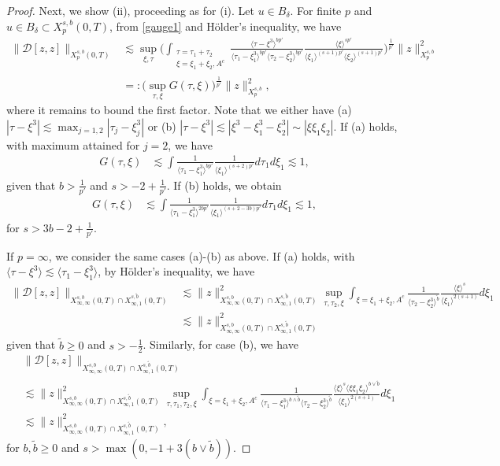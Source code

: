 \documentclass[a4paper,
11pt,  reqno]{amsart}
\newcommand{\5}{\textup{V}}
\newcommand{\les}{\lesssim}
\newcommand{\dl}{\delta}
\newcommand{\wt}{\widetilde}
\theoremstyle{remark}
\newcommand{\jb}[1]
{\langle #1 \rangle}
\numberwithin{equation}{section}
\numberwithin{theorem}{section}
\newcommand{\DD}{\mathcal{D}}
\begin{document}
\begin{proof}
Next, we show (ii), proceeding as for (i). Let $u \in B_\dl$. 
For finite $p$ and $u\in B_\dl \subset X^{s, b}_{p}(0,T)$,
from \eqref{gauge1} and H\"older's inequality,
we have
\begin{align}
\| \DD[z,z] \|_{X^{s, b}_p(0,T)} 
&
\les
\sup_{\xi, \tau} \bigg( \int_{\substack{\tau=\tau_1 + \tau_2 \\ \xi = \xi_1 + \xi_2, A^c}} 
\frac{\jb{\tau-\xi^3}^{bp'}}{\jb{\tau_1-\xi_1^3}^{bp'} \jb{\tau_2 - \xi_2^3}^{bp'} } \frac{\jb{\xi}^{sp'}}{ \jb{\xi_1}^{(s+1)p'} \jb{\xi_2}^{(s+1)p'}}
\bigg)^{\frac{1}{p'}}
\| z\|^2_{X^{s, b}_{p}}
\\
&
=: \Big( \sup_{ \tau, \xi} G(\tau, \xi) \Big)^{\frac{1}{p'}}
\| z\|^2_{X^{s, b}_{p}}
,
\end{align}
where it remains to bound the first factor. 
Note that we either have (a) $|\tau- \xi^3| \les \max_{j=1,2} |\tau_j - \xi_j^3|$ or (b) $|\tau - \xi^3| \les |\xi^3 - \xi_1^3 - \xi_2^3| \sim |\xi \xi_1\xi_2|$.
If (a) holds, with maximum attained for $j=2$, we have
\begin{align}
    G(\tau, \xi) 
    &
    \les 
    \int \frac{1}{\jb{\tau_1 - \xi_1^3}^{bp'}} \frac{1}{\jb{\xi_1}^{(s+2)p'}} d\tau_1 d\xi_1 \les 1, 
\end{align}
given that $b> \frac{1}{p'}$ and $s>-2 + \frac{1}{p'}$. If (b) holds, we obtain
\begin{align}
    G(\tau, \xi) 
    &
    \les 
    \int \frac{1}{\jb{\tau_1 - \xi_1^3}^{2bp'}} \frac{1}{\jb{\xi_1}^{(s+2-3b)p'}} d\tau_1 d\xi_1 \les 1, 
\end{align}
for $s>3b - 2 + \frac{1}{p'}$.

If $p=\infty$, we consider the same cases (a)-(b) as above.
If (a) holds, with $\jb{\tau-\xi^3} \les \jb{\tau_1 - \xi_1^3}$, by H\"older's inequality, we have 
\begin{align}
    \| \DD[z,z] \|_{X^{s, b}_{\infty, \infty}(0,T) \cap X^{s, \wt b}_{\infty, 1}(0,T) }
    &
    \les 
    \| z\|_{X^{s, b}_{\infty, \infty}(0,T) \cap X^{s, \wt b}_{\infty, 1}(0,T)}^2 
    \sup_{\tau, \tau_2, \xi} \int_{\xi=\xi_1+\xi_2,A^c
    } \frac{1}{\jb{\tau_2-\xi_2^3}^{\wt b}} \frac{\jb{\xi}^s}{\jb{\xi_1}^{2(s+1)}} d\xi_1 
    \\
    &
    \les \| z\|_{X^{s, b}_{\infty, \infty}(0,T) \cap X^{s, \wt b}_{\infty, 1}(0,T)}^2 
\end{align}
given that $\wt b\ge0$ and $s>-\frac12$.
Similarly, for case (b), we have
\begin{align}
& \| \DD[z,z] \|_{X^{s, b}_{\infty, \infty}(0,T) \cap X^{s, \wt b}_{\infty, 1}(0,T) }
\\
    &
    \les 
    \| z\|_{X^{s, b}_{\infty, \infty}(0,T) \cap X^{s, \wt b}_{\infty, 1}(0,T)}^2 
    \sup_{\tau, \tau_1, \tau_2 , \xi} \int_{\xi=\xi_1+\xi_2,A^c
    } \frac{1}{\jb{\tau_1-\xi_1^3}^{b\land \wt b}\jb{\tau_2-\xi_2^3}^{ \wt b}} \frac{\jb{\xi}^s \jb{\xi \xi_1 \xi_2}^{b \lor \wt b}}{\jb{\xi_1}^{2(s+1)}} d\xi_1 
    \\
    &
    \les \| z\|_{X^{s, b}_{\infty, \infty}(0,T) \cap X^{s, \wt b}_{\infty, 1}(0,T)}^2 
    ,
\end{align}
for $b,\wt b \ge0$ and $s> \max(0, -1 + 3 (b \lor \wt b))$. 





\end{proof}
\end{document}
